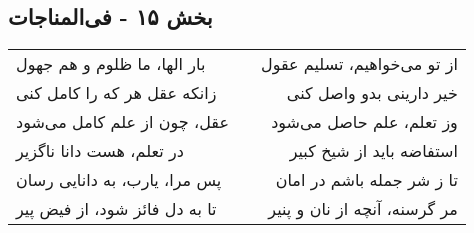 \begin{center}
\section*{بخش ۱۵ - فی‌المناجات}
\label{sec:015}
\begin{longtable}{l p{0.5cm} r}
بار الها، ما ظلوم و هم جهول
&&
از تو می‌خواهیم، تسلیم عقول
\\
زانکه عقل هر که را کامل کنی
&&
خیر دارینی بدو واصل کنی
\\
عقل، چون از علم کامل می‌شود
&&
وز تعلم، علم حاصل می‌شود
\\
در تعلم، هست دانا ناگزیر
&&
استفاضه باید از شیخ کبیر
\\
پس مرا، یارب، به دانایی رسان
&&
تا ز شر جمله باشم در امان
\\
تا به دل فائز شود، از فیض پیر
&&
مر گرسنه، آنچه از نان و پنیر
\\
\end{longtable}
\end{center}
